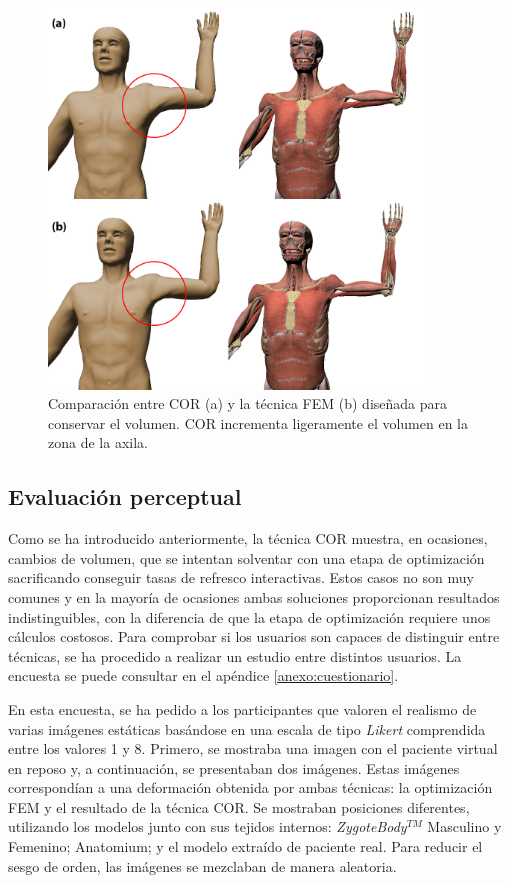 \begin{figure}[ht]%
   \centering
   \includegraphics[width=0.9\textwidth]{IMG/AntCOR}
    \caption{ Comparación entre \acs{COR} (a) y la técnica \acs{FEM} (b) diseñada para conservar el volumen. \acs{COR} incrementa ligeramente el volumen en la zona de la axila.}
    \label{fig:anatomium}
\end{figure}

\subsection{Evaluación perceptual}


%
Como se ha introducido anteriormente, la técnica \ac{COR} muestra, en ocasiones, cambios de volumen, que se intentan solventar con una etapa de optimización sacrificando conseguir tasas de refresco interactivas. Estos casos no son muy comunes y en la mayoría de ocasiones ambas soluciones proporcionan resultados indistinguibles, con la diferencia de que la etapa de optimización requiere unos cálculos costosos. 
Para comprobar si los usuarios son capaces de distinguir entre técnicas, se ha procedido a realizar un estudio entre distintos usuarios. La encuesta se puede consultar en el apéndice \ref{anexo:cuestionario}.

En esta encuesta, se ha pedido a los participantes que valoren el realismo de varias imágenes estáticas basándose en una escala de tipo \emph{Likert} comprendida entre los valores 1 y 8. Primero, se mostraba una imagen con el paciente virtual en reposo
y, a continuación, se presentaban dos  imágenes. Estas imágenes correspondían a una deformación obtenida por ambas técnicas: la optimización \ac{FEM} y el resultado de la técnica \ac{COR}. Se mostraban posiciones diferentes, utilizando los modelos junto con sus tejidos internos: \emph{ZygoteBody}$^{TM}$ Masculino y Femenino; Anatomium; y el modelo extraído de paciente real. Para reducir el sesgo de orden, las imágenes se mezclaban de manera aleatoria.


